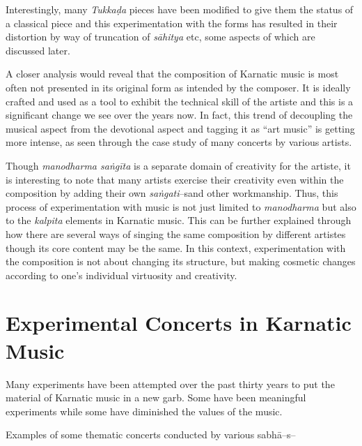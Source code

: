Interestingly, many \textit{Tukkaḍa} pieces have been modified to give them the status of a classical piece and this experimentation with the forms has resulted in their distortion by way of truncation of \textit{sāhitya} etc, some aspects of which are discussed later.

A closer analysis would reveal that the composition of Karnatic music is most often not presented in its original form as intended by the composer. It is ideally crafted and used as a tool to exhibit the technical skill of the artiste and this is a significant change we see over the years now. In fact, this trend of decoupling the musical aspect from the devotional aspect and tagging it as “art music” is getting more intense, as seen through the case study of many concerts by various artists.

Though \textit{manodharma saṅgīta} is a separate domain of creativity for the artiste, it is interesting to note that many artists exercise their creativity even within the composition by adding their own \textit{saṅgati}–s\break and other workmanship. Thus, this process of experimentation with music is not just limited to \textit{manodharma} but also to the \textit{kalpita} elements in Karnatic music. This can be further explained through how there are several ways of singing the same composition by different artistes though its core content may be the same. In this context, experimentation with the composition is not about changing its structure, but making cosmetic changes according to one’s individual virtuosity and creativity.


\section*{Experimental Concerts in Karnatic Music}

Many experiments have been attempted over the past thirty years to put the material of Karnatic music in a new garb. Some have been meaningful experiments while some have diminished the values of the music.

Examples of some thematic concerts conducted by various sabhā–s–


